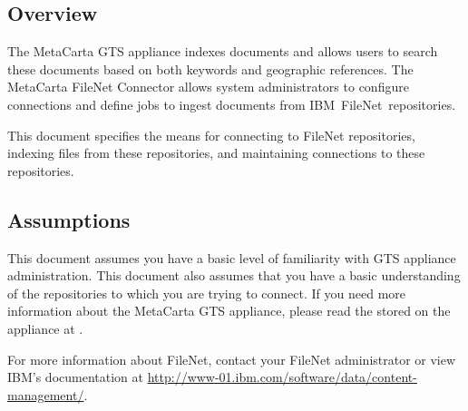 %
%

\begin{changemargin}{1.5in}{0in}

\section{Overview}

The MetaCarta GTS appliance indexes documents and allows users to
search these documents based on both keywords and geographic
references. The MetaCarta FileNet Connector allows system
administrators to configure connections and define jobs to ingest
documents from IBM\circler\ FileNet\circler\ repositories.

This document specifies the means for connecting to FileNet
repositories, indexing files from these repositories, and maintaining
connections to these repositories.

\subsection{Assumptions}

This document assumes you have a basic level of familiarity with GTS
appliance administration. This document also assumes that you have a
basic understanding of the repositories to which you are trying to
connect. If you need more information about the MetaCarta GTS
appliance, please read the  stored on the appliance at
.

For more information about FileNet, contact your FileNet administrator
or view IBM's documentation at
\url{http://www-01.ibm.com/software/data/content-}\linebreak\url{management/}.


\end{changemargin}
